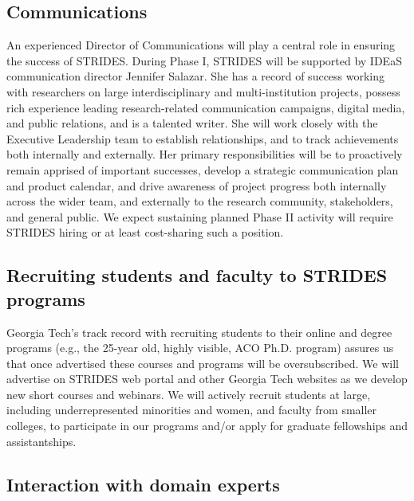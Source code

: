 \documentclass[12pt]{article}
\begin{document}
\subsection{Communications}
\label{sec:communication}
An experienced Director of Communications will play a central role in
ensuring the success of STRIDES. During Phase I, STRIDES will be supported by
IDEaS communication director Jennifer Salazar. She has a record of success working with researchers on large interdisciplinary and multi-institution projects, possess rich experience leading research-related communication campaigns, digital media, and public relations, and is a talented writer. She will work closely with the Executive Leadership team to establish relationships, and to track achievements both internally and externally.
Her primary responsibilities will be to proactively remain apprised of important successes, develop a strategic communication plan and %
product calendar, and drive awareness of project progress both internally across the wider team, and externally to the research community, stakeholders, and general public.
We expect sustaining planned Phase II activity will require STRIDES hiring or at least
cost-sharing such a position.



\vspace*{-1em}

\subsection{Recruiting students and faculty to STRIDES programs}
\label{sec:recruit}

Georgia Tech's track record with recruiting students to their online and degree programs (e.g., the 25-year old, highly visible, ACO Ph.D. program) assures us that once advertised these courses and programs will be oversubscribed.
We will advertise on STRIDES web portal and other Georgia Tech websites as we develop new short courses and webinars.
We will  actively recruit students at large, including underrepresented minorities and women, and faculty from smaller colleges, to participate in our programs and/or apply for graduate fellowships and assistantships.

\vspace*{-1em}
\subsection{Interaction with domain experts}
\end{document}
